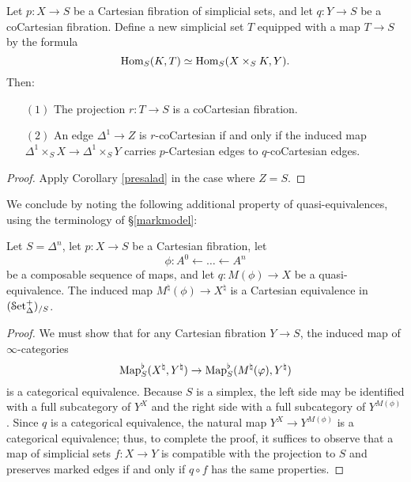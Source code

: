 \begin{corollary}\label{skinnysalad}
Let $p: X \rightarrow S$ be a Cartesian fibration of simplicial sets, and let
$q: Y \rightarrow S$ be a coCartesian fibration. Define a new simplicial set $T$
equipped with a map $T \rightarrow S$ by the formula
$$ \operatorname{Hom}_{S}(K, T) \simeq \operatorname{Hom}_{S}( X \times_{S} K, Y).$$
Then:
\begin{itemize}
\item[$(1)$] The projection $r: T \rightarrow S$ is a coCartesian fibration.
\item[$(2)$] An edge $\Delta^1 \rightarrow Z$ is $r$-coCartesian if and only if 
the induced map $\Delta^1 \times_{S} X \rightarrow \Delta^1 \times_{S} Y$
carries $p$-Cartesian edges to $q$-coCartesian edges.
\end{itemize}
\end{corollary}

\begin{proof}
Apply Corollary \ref{presalad} in the case where $Z = S$.
\end{proof}

We conclude by noting the following additional property of quasi-equivalences, using the terminology of \S \ref{markmodel}:

\begin{proposition}\label{halfy}
Let $S = \Delta^n$, let $p: X \rightarrow S$ be a Cartesian fibration, let
$$\phi: A^0 \leftarrow \ldots \leftarrow A^n$$ be a composable sequence of maps, and let
$q: M(\phi) \rightarrow X$ be a quasi-equivalence. The induced map $M^{\natural}(\phi) \rightarrow X^{\natural}$ is a Cartesian equivalence in $(\operatorname{\mathcal{S}et_{\Delta}^{+}})_{/S}$.
\end{proposition}

\begin{proof}
We must show that for any Cartesian fibration $Y \rightarrow S$, the induced map
of $\infty$-categories $$\operatorname{{Map}}^{\flat}_{S}(X^{\natural}, Y^{\natural}) \rightarrow \operatorname{{Map}}^{\flat}_S( M^{\natural}(\varphi), Y^{\natural} )$$
is a categorical equivalence. Because $S$ is a simplex, the left side may be identified with a full subcategory of $Y^X$ and the right side with a full subcategory of $Y^{M(\phi)}$. Since $q$ is a categorical equivalence, the natural map
$Y^X \rightarrow Y^{M(\phi)}$ is a categorical equivalence; thus, to complete the proof, it suffices to observe that a map of simplicial sets $f: X \rightarrow Y$ is compatible with the projection to $S$ and preserves marked edges if and only if $q \circ f$ has the same properties.
\end{proof}

